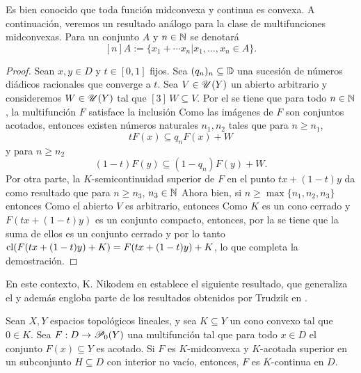 Es bien conocido que toda función midconvexa y continua es convexa.
A continuación, veremos un resultado análogo para la clase de multifunciones
midconvexas. Para un conjunto $A$ y $n\in\N$ se denotará 
$$
[n]A:=\{x_1+\cdots x_n | x_1,\ldots,x_n\in A\}.
$$ 
\begin{proof}
Sean $x,y\in D$ y $t\in[0,1]$ fijos. Sea $(q_n)_n\subseteq\D$ una sucesión de números
diádicos racionales que converge a $t$. Sea $V\in \U(Y)$ un abierto 
arbitrario y consideremos $W\in\U(Y)$ tal que $[3]\,W\subseteq V.$ 
Por el  se tiene que para
todo $n\in\N$, la multifunción $F$ satisface la inclusión
Como las imágenes de $F$ son conjuntos acotados, entonces existen
números naturales $n_1, n_2$ tales que para $n\geq n_1$, 
$$tF(x)\subseteq q_nF(x)+W$$
 y para $n\geq n_2$
$$(1-t)F(y)\subseteq(1-q_n)F(y)+W.$$ 
Por otra parte, la $K$-semicontinuidad superior de $F$ en 
el punto $tx+(1-t)y$ da como resultado que para $n\geq n_3$,
$n_3\in\N$ 
Ahora bien, si $n\geq\max\{n_1,n_2,n_3\}$ entonces
Como el abierto $V$ es arbitrario, entonces
Como $K$ es un cono cerrado y $F(tx+(1-t)y)$ es un conjunto
compacto, entonces, por la  se tiene que
la suma de ellos es un conjunto cerrado y por lo tanto
$\cl(F(tx+(1-t)y)+K)=F(tx+(1-t)y)+K$, lo que completa la demostración.
\end{proof}


En este contexto, K. Nikodem en \cite{Nik86} establece el siguiente resultado, que 
generaliza el  y además engloba parte de los resultados 
obtenidos por Trudzik en \cite{Tru84}.

\begin{theorem}
\label{Nik861}
Sean $X,Y$ espacios topológicos lineales, y sea $K\subseteq Y$ un cono convexo
tal que $0\in K$.
Sea $F:D\to \P_0(Y)$ una multifunción tal que para todo $x\in D$ el conjunto
$F(x)\subseteq Y$ es acotado. Si $F$ es $K$-midconvexa y $K$-acotada superior
en un subconjunto $H\subseteq D$ con interior no vacío, entonces,
$F$ es $K$-continua en $D$.
\end{theorem}


